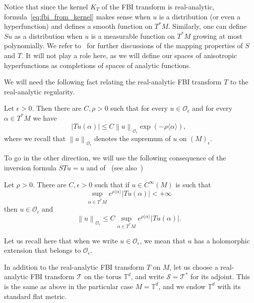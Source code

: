\documentclass[10pt]{amsart}
\theoremstyle{definition}\newtheorem{defi}[theo]{Definition}\newtheorem{rema}[theo]{Remark}\newtheorem{exam}[theo]{Example}\newtheorem{exem}[theo]{Example}\newtheorem{nota}[theo]{Notation}
\newcommand{\p}[1]{\left(#1\right)}
\newcommand{\n}[1]{\left\|#1\right\|}
\newcommand{\va}[1]{\left|#1\right|}
\newcommand{\brac}[1]{\langle #1 \rangle}
\newcommand{\clO}{\mathcal{O}}
\newcommand{\clT}{\mathcal{T}}
\newcommand{\clS}{\mathcal{S}}
\newcommand{\bbT}{\mathbb{T}}
\begin{document}
Notice that since the kernel $K_T$ of the FBI transform is real-analytic, formula~\eqref{eq:fbi_from_kernel} makes sense when $u$ is a distribution (or even a hyperfunction) and defines a smooth function on $T^* M$. Similarly, one can define $Su$ as a distribution when $u$ is a measurable function on $T^* M$ growing at most polynomially. We refer to~\cite[\S~2.1]{BJ20} for further discussions of the mapping properties of $S$ and $T$. It will not play a role here, as we will define our spaces of anisotropic hyperfunctions as completions of spaces of analytic functions.

We will need the following fact relating the real-analytic FBI transform $T$ to the real-analytic regularity.

\begin{prop}[{\cite[Lemma~2.4]{BJ20}}]\label{proposition:decay_from_analytic}
Let $\epsilon > 0$. Then there are $C,\rho > 0$ such that for every $u \in \clO_\epsilon$ and for every $\alpha \in T^* M$ we have
\begin{equation*}
\va{Tu(\alpha)} \leq C \n{u}_{\clO_\epsilon} \exp\p{- \rho \brac{\alpha}},
\end{equation*}
where we recall that $\n{u}_{\clO_\epsilon}$ denotes the supremum of $u$ on $(M)_\epsilon$.
\end{prop}

To go in the other direction, we will use the following consequence of the inversion formula $STu = u$ and of~\cite[Lemma~2.6]{BJ20} (see also~\cite[Proposition~2.6]{BJ20})

\begin{prop}\label{proposition:analytic_from_decay}
Let $\rho > 0$. There are $C,\epsilon > 0$ such that if $u \in C^\infty(M)$ is such that
\begin{equation*}
\sup_{\alpha \in T^* M} e^{\rho \brac{\alpha}} \va{Tu(\alpha)} < + \infty
\end{equation*}
then $u \in \clO_\epsilon$ and
\begin{equation*}
\n{u}_{\clO_\epsilon} \leq C \sup_{\alpha \in T^* M} e^{\rho \brac{\alpha}} \va{Tu(\alpha)}.
\end{equation*}
\end{prop}

Let us recall here that when we write $u \in \clO_\epsilon$, we mean that $u$ has a holomorphic extension that belongs to $\clO_\epsilon$.

In addition to the real-analytic FBI transform $T$ on $M$, let us choose a real-analytic FBI transform $\clT$ on the torus $\bbT^d$, and write $\clS = \clT^*$ for its adjoint. This is the same as above in the particular case $M = \bbT^d$, and we endow $\bbT^d$ with its standard flat metric.
\end{document}
